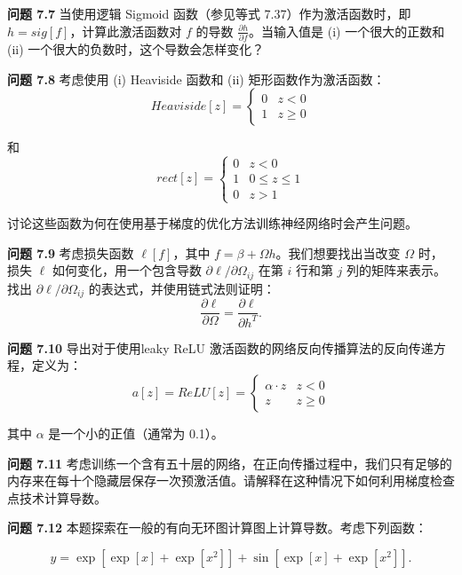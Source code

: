 \textbf{问题 7.7} 当使用逻辑 Sigmoid 函数（参见等式 7.37）作为激活函数时，即 \(h = sig[f]\)，计算此激活函数对 \(f\) 的导数 \(\frac{\partial h}{\partial f}\)。当输入值是 (i) 一个很大的正数和 (ii) 一个很大的负数时，这个导数会怎样变化？

\textbf{问题 7.8} 考虑使用 (i) Heaviside 函数和 (ii) 矩形函数作为激活函数：
\begin{equation}
Heaviside[z] = \begin{cases}
0 & z < 0 \\
1 & z \geq 0
\end{cases} 
\end{equation}

和
\begin{equation}
rect[z] = \begin{cases}
0 & z < 0 \\
1 & 0 \leq z \leq 1 \\
0 & z > 1
\end{cases} 
\end{equation}

讨论这些函数为何在使用基于梯度的优化方法训练神经网络时会产生问题。

\textbf{问题 7.9} 考虑损失函数 \(\ell[f]\)，其中 \(f = \beta + \Omega h\)。我们想要找出当改变 \(\Omega\) 时，损失 \(\ell\) 如何变化，用一个包含导数 \(\partial\ell/\partial\Omega_{ij}\) 在第 \(i\) 行和第 \(j\) 列的矩阵来表示。找出 \(\partial\ell/\partial\Omega_{ij}\) 的表达式，并使用链式法则证明：
\begin{equation}
\frac{\partial \ell}{\partial \Omega} = \frac{\partial \ell}{\partial h^T}. 
\end{equation}

\textbf{问题 7.10} 导出对于使用leaky ReLU 激活函数的网络反向传播算法的反向传递方程，定义为：
\begin{equation}
a[z] = ReLU[z] = \begin{cases}
\alpha \cdot z & z < 0 \\
z & z \geq 0
\end{cases} 
\end{equation}

其中 \(\alpha\) 是一个小的正值（通常为 0.1）。

\textbf{问题 7.11} 考虑训练一个含有五十层的网络，在正向传播过程中，我们只有足够的内存来在每十个隐藏层保存一次预激活值。请解释在这种情况下如何利用梯度检查点技术计算导数。

\textbf{问题 7.12} 本题探索在一般的有向无环图计算图上计算导数。考虑下列函数：

\begin{equation}
y = \exp [\exp[x] + \exp[x^2]] + \sin[\exp[x] + \exp[x^2]]. 
\end{equation}

